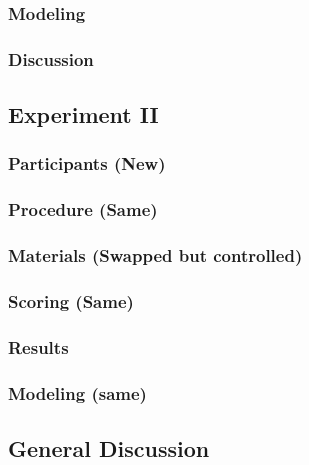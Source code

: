 \documentclass[]{book}
\begin{document}
\hypertarget{modeling-1}{%
\subsubsection{Modeling}\label{modeling-1}}

\hypertarget{discussion-1}{%
\subsubsection{Discussion}\label{discussion-1}}

\hypertarget{experiment-ii}{%
\subsection{Experiment II}\label{experiment-ii}}

\hypertarget{participants-new}{%
\subsubsection{Participants (New)}\label{participants-new}}

\hypertarget{procedure-same}{%
\subsubsection{Procedure (Same)}\label{procedure-same}}

\hypertarget{materials-swapped-but-controlled}{%
\subsubsection{Materials (Swapped but controlled)}\label{materials-swapped-but-controlled}}

\hypertarget{scoring-same}{%
\subsubsection{Scoring (Same)}\label{scoring-same}}

\hypertarget{results-2}{%
\subsubsection{Results}\label{results-2}}

\hypertarget{modeling-same}{%
\subsubsection{Modeling (same)}\label{modeling-same}}

\hypertarget{general-discussion}{%
\subsection{General Discussion}\label{general-discussion}}
\end{document}
